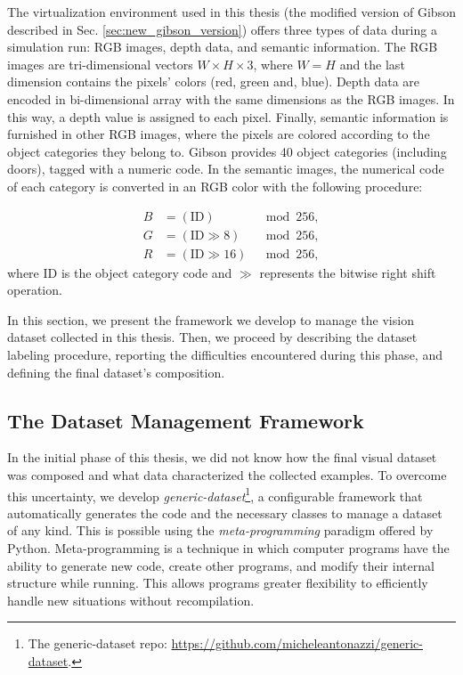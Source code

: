 The virtualization environment used in this thesis (the modified version of Gibson described in Sec. \ref{sec:new_gibson_version}) offers three types of data during a simulation run: RGB images, depth data, and semantic information. The RGB images are tri-dimensional vectors $W \times H \times 3$, where $W = H$ and the last dimension contains the pixels' colors (red, green and, blue). Depth data are encoded in bi-dimensional array with the same dimensions as the RGB images. In this way, a depth value is assigned to each pixel. Finally, semantic information is furnished in other RGB images, where the pixels are colored according to the object categories they belong to. Gibson provides 40 object categories (including doors), tagged with a numeric code. In the semantic images, the numerical code of each category is converted in an RGB color with the following procedure:

\begin{equation}
\label{eq:pareto mle2}
\begin{aligned}
B &= (\text{ID}) &\mod 256, \\
G &= (\text{ID} \gg 8) &\mod 256, \\
R &= (\text{ID} \gg 16) &\mod 256,
\end{aligned}
\end{equation}
where ID is the object category code and $\gg$ represents the bitwise right shift operation. 

In this section, we present the framework we develop to manage the vision dataset collected in this thesis. Then, we proceed by describing the dataset labeling procedure, reporting the difficulties encountered during this phase, and defining the final dataset's composition.

\subsection{The Dataset Management Framework}

In the initial phase of this thesis, we did not know how the final visual dataset was composed and what data characterized the collected examples. To overcome this uncertainty, we develop \textit{generic-dataset}\footnote{The generic-dataset repo: \url{https://github.com/micheleantonazzi/generic-dataset}.}, a configurable framework that automatically generates the code and the necessary classes to manage a dataset of any kind. This is possible using the \textit{meta-programming} paradigm offered by Python. Meta-programming is a technique in which computer programs have the ability to generate new code, create other programs, and modify their internal structure while running. This allows programs greater flexibility to efficiently handle new situations without recompilation. 

